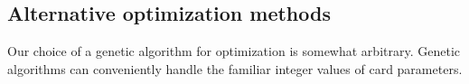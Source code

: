 

\subsection{Alternative optimization methods}

Our choice of a genetic algorithm for optimization is somewhat arbitrary. Genetic algorithms can conveniently 
handle the familiar integer values of card parameters. 

